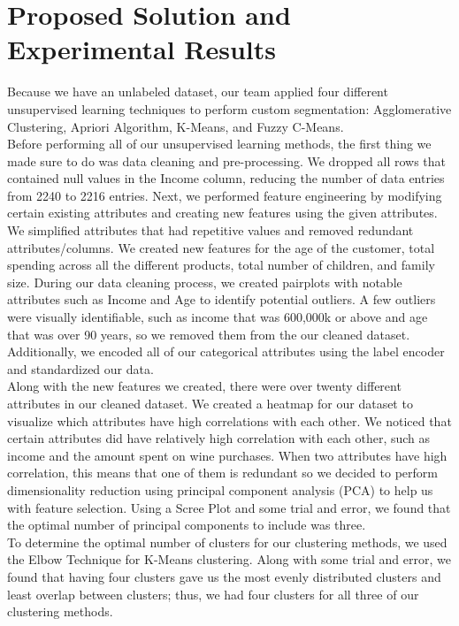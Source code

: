 \documentclass[12pt]{article}
\begin{document}
\section{Proposed Solution and Experimental Results}

Because we have an unlabeled dataset, our team applied four different unsupervised learning techniques to perform custom segmentation: Agglomerative Clustering, Apriori Algorithm, K-Means, and Fuzzy C-Means.\\

\noindent Before performing all of our unsupervised learning methods, the first thing we made sure to do was data cleaning and pre-processing. We dropped all rows that contained null values in the Income column, reducing the number of data entries from 2240 to 2216 entries. Next, we performed feature engineering by modifying certain existing attributes and creating new features using the given attributes. We simplified attributes that had repetitive values and removed redundant attributes/columns. We created new features for the age of the customer, total spending across all the different products, total number of children, and family size. During our data cleaning process, we created pairplots with notable attributes such as Income and Age to identify potential outliers. A few outliers were visually identifiable, such as income that was 600,000k or above and age that was over 90 years, so we removed them from the our cleaned dataset. Additionally, we encoded all of our categorical attributes using the label encoder and standardized our data.\\

\noindent Along with the new features we created, there were over twenty different attributes in our cleaned dataset. We created a heatmap for our dataset to visualize which attributes have high correlations with each other. We noticed that certain attributes did have relatively high correlation with each other, such as income and the amount spent on wine purchases. When two attributes have high correlation, this means that one of them is redundant so we decided to perform dimensionality reduction using principal component analysis (PCA) to help us with feature selection. Using a Scree Plot and some trial and error, we found that the optimal number of principal components to include was three.\\ 

\noindent To determine the optimal number of clusters for our clustering methods, we used the Elbow Technique for K-Means clustering. Along with some trial and error, we found that having four clusters gave us the most evenly distributed clusters and least overlap between clusters; thus, we had four clusters for all three of our clustering methods.\\
\end{document}
